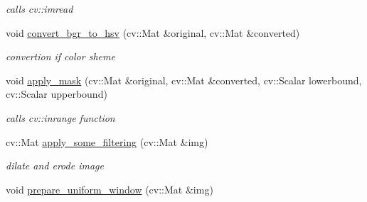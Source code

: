 \begin{DoxyCompactItemize}
\begin{DoxyCompactList}\small\item\em calls cv\+::imread \end{DoxyCompactList}\item 
\mbox{\label{class_image_processing_1_1_character___recognition___algorithm_a4b64167debaa2761914f08fceb6a3d7c}} 
void \mbox{\hyperlink{class_image_processing_1_1_character___recognition___algorithm_a4b64167debaa2761914f08fceb6a3d7c}{convert\+\_\+bgr\+\_\+to\+\_\+hsv}} (cv\+::\+Mat \&original, cv\+::\+Mat \&converted)
\begin{DoxyCompactList}\small\item\em convertion if color sheme \end{DoxyCompactList}\item 
\mbox{\label{class_image_processing_1_1_character___recognition___algorithm_a3034cccb3aab0be8fe39c76faa3618be}} 
void \mbox{\hyperlink{class_image_processing_1_1_character___recognition___algorithm_a3034cccb3aab0be8fe39c76faa3618be}{apply\+\_\+mask}} (cv\+::\+Mat \&original, cv\+::\+Mat \&converted, cv\+::\+Scalar lowerbound, cv\+::\+Scalar upperbound)
\begin{DoxyCompactList}\small\item\em calls cv\+::inrange function \end{DoxyCompactList}\item 
\mbox{\label{class_image_processing_1_1_character___recognition___algorithm_a71f57a3cccdc610b736f0a1144fa4a7f}} 
cv\+::\+Mat \mbox{\hyperlink{class_image_processing_1_1_character___recognition___algorithm_a71f57a3cccdc610b736f0a1144fa4a7f}{apply\+\_\+some\+\_\+filtering}} (cv\+::\+Mat \&img)
\begin{DoxyCompactList}\small\item\em dilate and erode image \end{DoxyCompactList}\item 
\mbox{\label{class_image_processing_1_1_character___recognition___algorithm_a9f546a88cdebb36ef0128537e02f5a80}} 
void \mbox{\hyperlink{class_image_processing_1_1_character___recognition___algorithm_a9f546a88cdebb36ef0128537e02f5a80}{prepare\+\_\+uniform\+\_\+window}} (cv\+::\+Mat \&img)

\end{DoxyCompactItemize}
